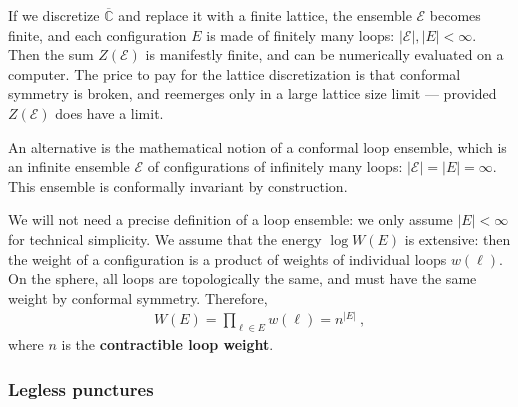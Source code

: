 \documentclass[12pt, a4paper]{article}
\newcommand{\myindex}[1]{\textbf{\boldmath #1}}
\begin{document}
If we discretize $\overline{\mathbb{C}}$ and replace it with a finite lattice, the ensemble $\mathcal{E}$ becomes finite, and each configuration $E$ is made of finitely many loops: $|\mathcal{E}|, |E|<\infty$. Then the sum $Z(\mathcal{E})$ is manifestly finite, and can be numerically evaluated on a computer. The price to pay for the lattice discretization is that conformal symmetry is broken, and reemerges only in a large lattice size limit --- provided $Z(\mathcal{E})$ does have a limit. 

An alternative is the mathematical notion of a conformal loop ensemble, which is an infinite ensemble $\mathcal{E}$ of configurations of infinitely many loops: $|\mathcal{E}|=|E|=\infty$. This ensemble is conformally invariant by construction. 

We will not need a precise definition of a loop ensemble: we only assume $|E|<\infty$ for technical simplicity. We assume that the energy $\log W(E)$ is extensive: then the weight of a configuration is a product of weights of individual loops $w(\ell)$. On the sphere, all loops are topologically the same, and must have the same weight by conformal symmetry. Therefore,
\begin{align}
 W(E) = \prod_{\ell \in E } w(\ell) = n^{|E|}\ ,
 \label{woe}
\end{align}
where $n$ is the \myindex{contractible loop weight}. 


\subsubsection{Legless punctures}
\end{document}
